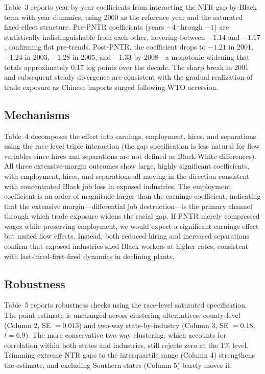 \documentclass[12pt]{article}
\begin{document}
Table~3 reports year-by-year coefficients from interacting the NTR-gap-by-Black term with year dummies, using 2000 as the reference year and the saturated fixed-effect structure. Pre-PNTR coefficients (years $-4$ through $-1$) are statistically indistinguishable from each other, hovering between $-1.14$ and $-1.17$, confirming flat pre-trends. Post-PNTR, the coefficient drops to $-1.21$ in 2001, $-1.24$ in 2003, $-1.28$ in 2005, and $-1.33$ by 2008---a monotonic widening that totals approximately 0.17 log points over the decade. The sharp break in 2001 and subsequent steady divergence are consistent with the gradual realization of trade exposure as Chinese imports surged following WTO accession.



\subsection{Mechanisms}

Table~4 decomposes the effect into earnings, employment, hires, and separations using the race-level triple interaction (the gap specification is less natural for flow variables since hires and separations are not defined as Black-White differences). All three extensive-margin outcomes show large, highly significant coefficients, with employment, hires, and separations all moving in the direction consistent with concentrated Black job loss in exposed industries. The employment coefficient is an order of magnitude larger than the earnings coefficient, indicating that the extensive margin---differential job destruction---is the primary channel through which trade exposure widens the racial gap. If PNTR merely compressed wages while preserving employment, we would expect a significant earnings effect but muted flow effects. Instead, both reduced hiring and increased separations confirm that exposed industries shed Black workers at higher rates, consistent with last-hired-first-fired dynamics in declining plants.



\subsection{Robustness}

Table~5 reports robustness checks using the race-level saturated specification. The point estimate is unchanged across clustering alternatives: county-level (Column 2, SE $= 0.013$) and two-way state-by-industry (Column 3, SE $= 0.18$, $t = 6.9$). The more conservative two-way clustering, which accounts for correlation within both states and industries, still rejects zero at the 1\% level. Trimming extreme NTR gaps to the interquartile range (Column 4) strengthens the estimate, and excluding Southern states (Column 5) barely moves it.
\end{document}
